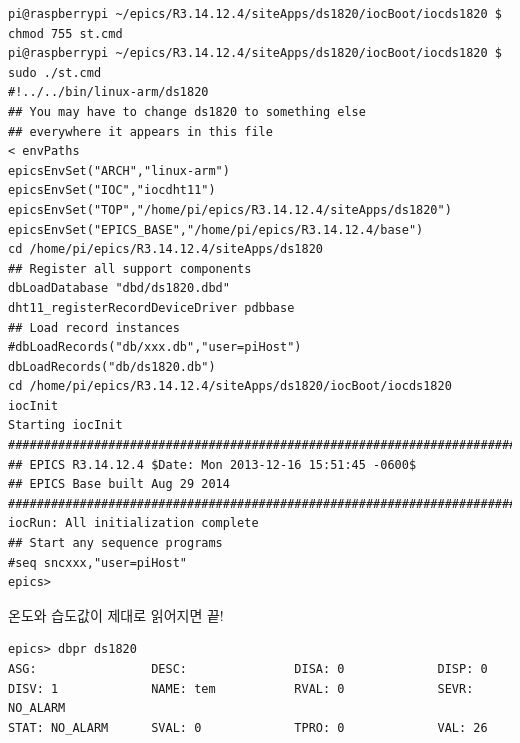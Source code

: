 \documentclass[11pt
  , a4paper
  , article
  , oneside
]{memoir}
\begin{document}
\begin{lstlisting}[style=termstyle]
pi@raspberrypi ~/epics/R3.14.12.4/siteApps/ds1820/iocBoot/iocds1820 $ chmod 755 st.cmd
pi@raspberrypi ~/epics/R3.14.12.4/siteApps/ds1820/iocBoot/iocds1820 $ sudo ./st.cmd
#!../../bin/linux-arm/ds1820
## You may have to change ds1820 to something else
## everywhere it appears in this file
< envPaths
epicsEnvSet("ARCH","linux-arm")
epicsEnvSet("IOC","iocdht11")
epicsEnvSet("TOP","/home/pi/epics/R3.14.12.4/siteApps/ds1820")
epicsEnvSet("EPICS_BASE","/home/pi/epics/R3.14.12.4/base")
cd /home/pi/epics/R3.14.12.4/siteApps/ds1820
## Register all support components
dbLoadDatabase "dbd/ds1820.dbd"
dht11_registerRecordDeviceDriver pdbbase
## Load record instances
#dbLoadRecords("db/xxx.db","user=piHost")
dbLoadRecords("db/ds1820.db")
cd /home/pi/epics/R3.14.12.4/siteApps/ds1820/iocBoot/iocds1820
iocInit
Starting iocInit
############################################################################
## EPICS R3.14.12.4 $Date: Mon 2013-12-16 15:51:45 -0600$
## EPICS Base built Aug 29 2014
############################################################################
iocRun: All initialization complete
## Start any sequence programs
#seq sncxxx,"user=piHost"
epics>
\end{lstlisting}
온도와 습도값이 제대로 읽어지면 끝!
\begin{lstlisting}[style=termstyle]
epics> dbpr ds1820
ASG:                DESC:               DISA: 0             DISP: 0
DISV: 1             NAME: tem           RVAL: 0             SEVR: NO_ALARM
STAT: NO_ALARM      SVAL: 0             TPRO: 0             VAL: 26
\end{lstlisting}





\end{document}
